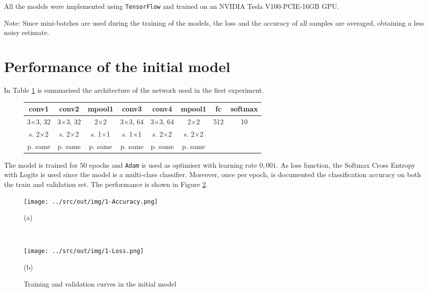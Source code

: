\documentclass[a4paper,12pt]{article} %
\begin{document}
	All the models were implemented using \texttt{TensorFlow} and trained on an 
	NVIDIA Tesla V100-PCIE-16GB GPU.
	
	Note: Since mini-batches are used during the training of the models, the 
	loss and the accuracy of all samples are averaged, obtaining a less noisy 
	estimate.
	
	\section{Performance of the initial model}
	\label{section:model0}
	In Table \ref{tab:model0} is summarised the architecture of the network 
	used in the first experiment.	
	
	\begin{figure}[H]
		\centering
		
		\begin{tabular}{cccccccc}
		\toprule
		\textbf{conv1} & \textbf{conv2} & \textbf{mpool1} & \textbf{conv3} &
		\textbf{conv4} & \textbf{mpool1} &   \textbf{fc} &
		\textbf{softmax} \\
		\midrule
		3$\times$3,  32 & 3$\times$3, 32 & 2$\times$2 &3$\times$3, 64 & 
		3$\times$3, 64  & 2$\times$2  & 512 & 10\\
		s. 2$\times$2 &   s. 2$\times$2 &   s. 1$\times$1 & s. 1$\times$1  & s. 
		2$\times$2 & s. 2$\times$2 && \\
		p. same & p. same & p. same  & p. same & p. same & p. same &&\\
		\bottomrule
		\end{tabular}
		\label{tab:model0}
	\end{figure}
	
	The model is trained for $50$ epochs and \texttt{Adam} is used as 
	optimiser with learning rate $0,001$.
	As loss function, the Softmax Cross Entropy with Logits is used since the 
	model is a multi-class classifier. Moreover, once per epoch, is documented 
	the classification accuracy on both the train and validation set.
	The performance is shown in Figure \ref{fig:model0-performance}.
	
	\begin{figure}[H]
		\begin{minipage}[c]{.49\textwidth}
			\centering
			\texttt{[image: ../src/out/img/1-Accuracy.png]}
			\caption*{(a)}
		\end{minipage}
		~
		\begin{minipage}[c]{.49\textwidth}
			\centering
			\texttt{[image: ../src/out/img/1-Loss.png]}
			\caption*{(b)}
		\end{minipage}
		\caption{Training and validation curves in the initial model}
		\label{fig:model0-performance}
	\end{figure}
	
\end{document}
